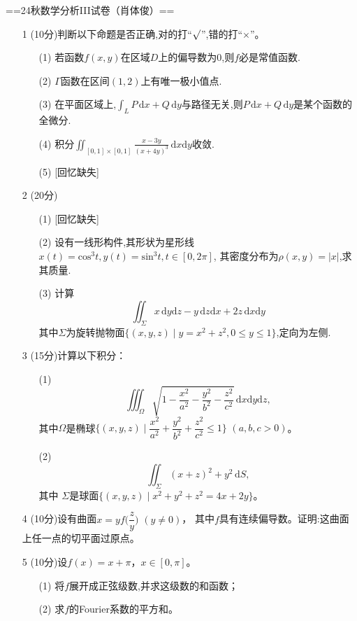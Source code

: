==24秋数学分析III试卷（肖体俊）==
\begin{enumerate} 
\item[1] (10分)判断以下命题是否正确,对的打“$\surd$”,错的打“$\times$”。
\begin{enumerate}
\item[(1)]若函数$f(x,y)$在区域$D$上的偏导数为$0$,则$f$必是常值函数.
\item[(2)]$\Gamma$函数在区间$(1,2)$上有唯一极小值点.
\item[(3)]在平面区域上,$\displaystyle\int_{L}P\,\mathrm{d}x+Q\,\mathrm{d}y$与路径无关,则$P\,\mathrm{d}x+Q\,\mathrm{d}y$是某个函数的全微分.
\item[(4)]积分$\displaystyle \iint_{[0,1]\times[0,1]} \frac{x-3y}{(x+4y)^{3}}\,\mathrm{d}x \mathrm{d}y$收敛.
\item[(5)][回忆缺失]
\end{enumerate}

\item[2](20分)
\begin{enumerate}
\item[(1)][回忆缺失]
\item[(2)]设有一线形构件,其形状为星形线$x(t)=\mathrm{cos}^{3}t,y(t)=\mathrm{sin}^{3}t,t\in\left[0,2\pi\right]$,
其密度分布为$\rho(x,y)=|x|$,求其质量.
\item[(3)]计算
\[\iint_{\Sigma}x\,\mathrm{d}y\mathrm{d}z-y\,\mathrm{d}z\mathrm{d}x+2z\,\mathrm{d}x\mathrm{d}y\]
其中$\Sigma$为旋转抛物面$\{(x,y,z)\mid y=x^{2}+z^{2},0\leq y \leq 1\}$,定向为左侧.
\end{enumerate}

\item[3](15分)计算以下积分：
\begin{enumerate}
\item[(1)]
\[\iiint_{\Omega}\sqrt{1-\frac{x^{2}}{a^{2}}-\frac{y^{2}}{b^{2}}-\frac{z^{2}}{c^{2}}}\, \mathrm{d}x\mathrm{d}y\mathrm{d}z,\]
其中$\Omega$是椭球$\{(x,y,z)\mid \dfrac{x^{2}}{a^{2}}+\dfrac{y^{2}}{b^{2}}+\dfrac{z^{2}}{c^{2}}\leq 1\}$ $(a,b,c >0)$。
\item[(2)]
\[\iint_{\Sigma}(x+z)^{2}+y^2 \,\mathrm{d}S,\]
其中 $\Sigma$是球面$\{(x,y,z)\mid x^{2}+y^{2}+z^{2}=4x+2y\}$。
\end{enumerate}

\item[4](10分)设有曲面$x=yf\Big(\dfrac{z}{y}\Big)$ $(y\neq 0)$，
其中$f$具有连续偏导数。证明:这曲面上任一点的切平面过原点。

\item[5](10分)设$f(x)=x+\pi$，$x\in[0,\pi]$。
\begin{enumerate}
\item[(1)]将$f$展开成正弦级数,并求这级数的和函数；
\item[(2)]求$f$的Fourier系数的平方和。
\end{enumerate}


\end{enumerate}
